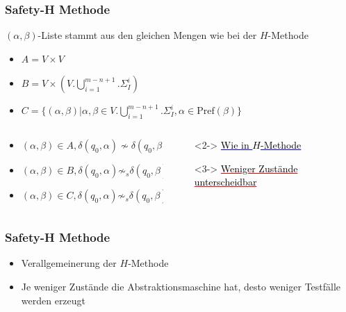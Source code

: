 \documentclass[10pt]{beamer}
\begin{document}
\begin{frame}
\frametitle{Safety-H Methode}
$(\alpha, \beta)$-Liste stammt aus den gleichen Mengen wie bei der $H$-Methode
\begin{itemize}
    \item $A=V\times V$
    \item $B=V\times (V.\bigcup\limits_{i=1}^{m-n+1}.\Sigma_I^i)$
    \item $C=\{(\alpha,\beta)|\alpha,\beta\in V.\bigcup\limits_{i=1}^{m-n+1}.\Sigma_I^i, \alpha \in \text{Pref}(\beta)\}$
  \end{itemize}

\begin{columns}[T] %
\begin{column}{.50\textwidth}
\pause
\begin{itemize}
  \item<2-> $(\alpha, \beta) \in A, \delta(q_0,\alpha) \not \sim \delta(q_0, \beta)$
  \item<3-> $(\alpha, \beta) \in B, \delta(q_0,\alpha) \not \sim_s \delta(q_0, \beta)$
  \item<3-> $(\alpha, \beta) \in C, \delta(q_0,\alpha) \not \sim_s \delta(q_0, \beta)$
\end{itemize}
  \end{column}%
  \begin{column}{.60\textwidth}

  \begin{itemize}
  \item[]<2-> \textcolor{blue}{\underline{\textcolor{black}{Wie in $H$-Methode}}}
  \item[]<3-> \textcolor{red}{\underline{\textcolor{black}{Weniger Zustände unterscheidbar}}}
\end{itemize}
  \end{column}
\end{columns}
\end{frame}

\begin{frame}
\frametitle{Safety-H Methode}
\begin{itemize}
  \item Verallgemeinerung der $H$-Methode
  \item Je weniger Zustände die Abstraktionsmaschine hat, desto weniger Testfälle werden erzeugt
\end{itemize}
\end{frame}
\end{document}
